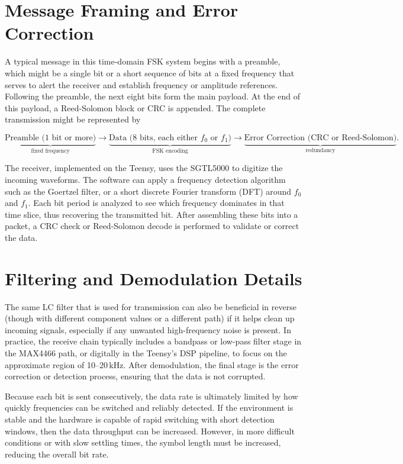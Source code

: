 \section{Message Framing and Error Correction}

A typical message in this time-domain FSK system begins with a preamble, which might be a single bit or a short sequence of bits at a fixed frequency that serves to alert the receiver and establish frequency or amplitude references. Following the preamble, the next eight bits form the main payload. At the end of this payload, a Reed-Solomon block or CRC is appended. The complete transmission might be represented by

\[
\underbrace{\text{Preamble (1 bit or more)}}_{\text{fixed frequency}} 
\longrightarrow 
\underbrace{\text{Data (8 bits, each either } f_0 \text{ or } f_1\text{)}}_{\text{FSK encoding}} 
\longrightarrow 
\underbrace{\text{Error Correction (CRC or Reed-Solomon)}}_{\text{redundancy}}.
\]

The receiver, implemented on the Teensy, uses the SGTL5000 to digitize the incoming waveforms. The software can apply a frequency detection algorithm such as the Goertzel filter, or a short discrete Fourier transform (DFT) around \(f_0\) and \(f_1\). Each bit period is analyzed to see which frequency dominates in that time slice, thus recovering the transmitted bit. After assembling these bits into a packet, a CRC check or Reed-Solomon decode is performed to validate or correct the data. 

\section{Filtering and Demodulation Details}

The same LC filter that is used for transmission can also be beneficial in reverse (though with different component values or a different path) if it helps clean up incoming signals, especially if any unwanted high-frequency noise is present. In practice, the receive chain typically includes a bandpass or low-pass filter stage in the MAX4466 path, or digitally in the Teensy's DSP pipeline, to focus on the approximate region of 10--20\,kHz. After demodulation, the final stage is the error correction or detection process, ensuring that the data is not corrupted. 

Because each bit is sent consecutively, the data rate is ultimately limited by how quickly frequencies can be switched and reliably detected. If the environment is stable and the hardware is capable of rapid switching with short detection windows, then the data throughput can be increased. However, in more difficult conditions or with slow settling times, the symbol length must be increased, reducing the overall bit rate.

